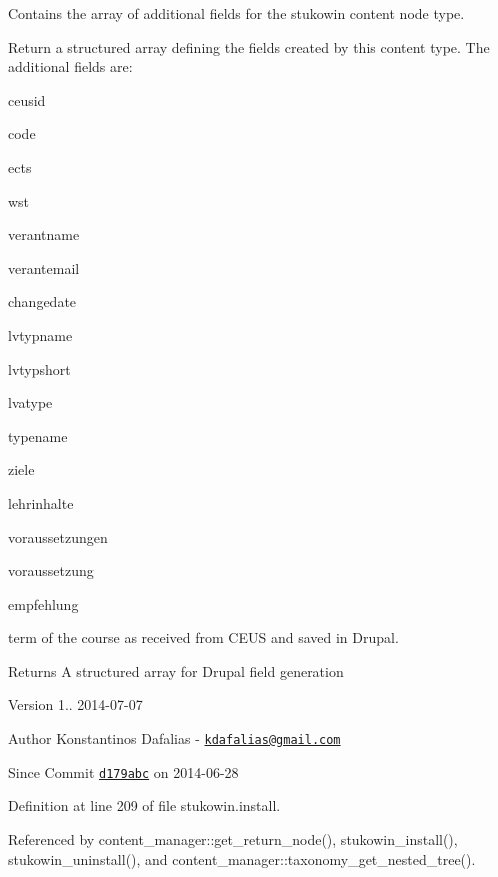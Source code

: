 Contains the array of additional fields for the stukowin content node type. 

Return a structured array defining the fields created by this content type. The additional fields are\+:
\begin{DoxyItemize}
\item ceusid
\item code
\item ects
\item wst
\item verantname
\item verantemail
\item changedate
\item lvtypname
\item lvtypshort
\item lvatype
\item typename
\item ziele
\item lehrinhalte
\item voraussetzungen
\item voraussetzung
\item empfehlung
\item term of the course as received from C\+E\+U\+S and saved in Drupal. \begin{DoxyReturn}{Returns}
A structured array for Drupal field generation
\end{DoxyReturn}
\begin{DoxyVersion}{Version}
1.. 2014-\/07-\/07 
\end{DoxyVersion}
\begin{DoxyAuthor}{Author}
Konstantinos Dafalias -\/ \href{mailto:kdafalias@gmail.com}{\tt kdafalias@gmail.\+com} 
\end{DoxyAuthor}
\begin{DoxySince}{Since}
Commit \href{http://github.com/TheJake123/DrupalModul/commit/d179abcc5e05743086cd67cf1ce30b08923a7183}{\tt d179abc} on 2014-\/06-\/28 
\end{DoxySince}

\end{DoxyItemize}

Definition at line 209 of file stukowin.\+install.



Referenced by content\+\_\+manager\+::get\+\_\+return\+\_\+node(), stukowin\+\_\+install(), stukowin\+\_\+uninstall(), and content\+\_\+manager\+::taxonomy\+\_\+get\+\_\+nested\+\_\+tree().

